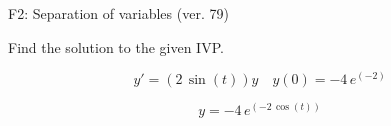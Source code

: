 \begin{exercise}
  \begin{exerciseTitle}F2: Separation of variables (ver. 79)\end{exerciseTitle}
  \begin{exerciseStatement}
    
Find the solution to the given IVP.

    
\[y'=( 2 \, \sin\left(t\right) )y\hspace{1em} y(0)= -4 \, e^{\left(-2\right)}\]

  \end{exerciseStatement}
  \begin{exerciseAnswer}
    
\[y= -4 \, e^{\left(-2 \, \cos\left(t\right)\right)}\]

  \end{exerciseAnswer}
\end{exercise}